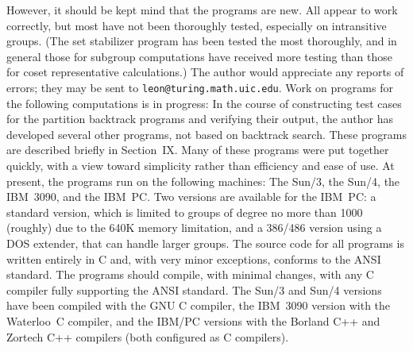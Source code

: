 However, it should be kept mind that the programs are new.
All appear to work correctly, but most have not
been thoroughly tested, especially on intransitive groups.  (The set
stabilizer program has been tested the most thoroughly, and in general those
for subgroup computations have received more testing than those for coset
representative calculations.)  The author would appreciate any reports of errors; they
may be sent to {\tt leon@turing.math.uic.edu}.
\medbreak
Work on programs for the following computations is in progress:
\medskip
{}
\vskip4pt
\vskip4pt
\medbreak
In the course of constructing test cases for the partition backtrack programs
and verifying their output,
the author has developed several other programs, not based on backtrack search.
These programs are described briefly in Section~IX.  Many of these programs
were put together quickly, with a view toward simplicity rather than
efficiency and ease of use.
\medbreak
At present, the programs run on the following machines: The Sun/3, the Sun/4,
the IBM~3090, and the IBM~PC.  Two versions are available for the IBM~PC: a standard version,
which is limited to groups of degree no more than 1000 (roughly) due
to the 640K memory limitation, and a 386/486 version using a DOS extender, that
can handle larger groups.  The source code for all programs is written
entirely in C and, with very minor exceptions, conforms to the ANSI
standard.  The programs should compile, with minimal changes, with
any C compiler fully supporting the ANSI standard.  The Sun/3 and Sun/4
versions have been compiled with the GNU C compiler, the IBM~3090 version with the
Waterloo~C compiler, and the IBM/PC versions with the Borland C++ and
Zortech C++ compilers (both configured as C compilers).
%
%
